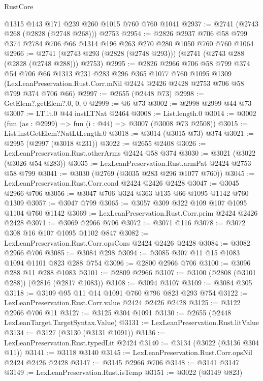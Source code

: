 \begin{lexlean}{RustCore}
\begin{coremodule}
    @1315
    @143
    @171
    @239
    @260
    @1015
    @760
    @760
    @1041
@2937 := @2741 (@2743 @268 (@2828 (@2748 @268))) @2753
@2954 := @2826
    @2937
    @706
    @58
    @799
    @374
    @2784
    @706
    @66
    @1314
    @196
    @263
    @270
    @280
    @1050
    @760
    @760
    @1064
@2966 := @2741 (@2743 @293 (@2828 (@2748 @293))) (@2741 (@2743 @288 (@2828 (@2748 @288))) @2753)
@2995 := @2826
    @2966
    @706
    @58
    @799
    @374
    @54
    @706
    @66
    @1313
    @231
    @283
    @296
    @365
    @1077
    @760
    @1095
    @1309
    (LexLeanPreservation.Rust.Corr.mNil @2424 @2426 @2428 @2753 @706 @58 @799 @374 @706 @66)
@2997 := @2655 (@2448 @73)
@2998 := GetElem?.getElem?.{0, 0, 0}
@2999 := @6 @73
@3002 := @2998 @2999 @44 @73
@3007 := LT.lt.{0} @44 instLTNat @2464
@3008 := List.length.{0}
@3014 := @3002 (fun (as : @2999) => fun (i : @44) => @3007 (@3008 @73 @2508))
@3015 := List.instGetElem?NatLtLength.{0}
@3018 := @3014 (@3015 @73) @374
@3021 := @2995 (@2997 (@3018 @231))
@3022 := @2655 @2408
@3026 := LexLeanPreservation.Rust.otherArms @2424 @58 @374
@3030 := @3021 (@3022 (@3026 @54 @283))
@3035 := LexLeanPreservation.Rust.armPat @2424 @2753 @58 @799
@3041 := @3030 (@2769 (@3035 @283 @296 @1077 @760))
@3045 := LexLeanPreservation.Rust.Corr.cond @2424 @2426 @2428
@3047 := @3045 @2966 @706
@3056 := @3047 @706 @324 @363 @135 @66 @1095 @1142 @760 @1309
@3057 := @3047 @799
@3065 := @3057 @309 @322 @109 @107 @1095 @1104 @760 @1142
@3069 := LexLeanPreservation.Rust.Corr.prim @2424 @2426 @2428
@3071 := @3069 @2966 @706
@3072 := @3071 @116
@3078 := @3072 @308 @16 @107 @1095 @1102 @847
@3082 := LexLeanPreservation.Rust.Corr.opsCons @2424 @2426 @2428
@3084 := @3082 @2966 @706
@3085 := @3084 @298
@3094 := @3085 @307 @11 @15 @1083 @1094 @1101 @823 @288 @754
@3096 := @2800 @2966 @706
@3100 := @3096 @288 @11 @288 @1083
@3101 := @2809 @2966
@3107 := @3100 (@2808 (@3101 @288)) (@2816 (@2817 @1083))
@3108 := @3094 @3107
@3109 := @3084 @305
@3118 := @3109 @95 @11 @14 @1091 @760 @796 @823 @293 @754
@3122 := LexLeanPreservation.Rust.Corr.value @2424 @2426 @2428
@3125 := @3122 @2966 @706 @11
@3127 := @3125 @304 @1091
@3130 := @2655 (@2448 LexLeanTarget.TargetSyntax.Value)
@3131 := LexLeanPreservation.Rust.litValue
@3134 := @3127 (@3130 (@3131 @1091))
@3136 := LexLeanPreservation.Rust.typedLit @2424
@3140 := @3134 (@3022 (@3136 @304 @11))
@3141 := @3118 @3140
@3145 := LexLeanPreservation.Rust.Corr.opsNil @2424 @2426 @2428
@3147 := @3145 @2966 @706
@3148 := @3141 @3147
@3149 := LexLeanPreservation.Rust.isTemp
@3151 := @3022 (@3149 @823)

\end{coremodule}
\end{lexlean}
